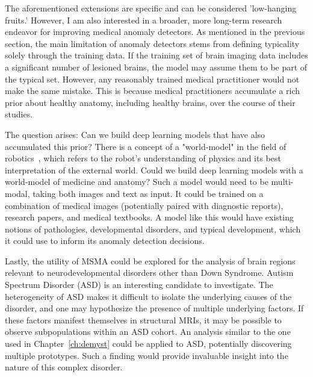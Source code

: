 The aforementioned extensions are specific and can be considered 'low-hanging fruits.' However, I am also interested in a broader, more long-term research endeavor for improving medical anomaly detectors. As mentioned in the previous section, the main limitation of anomaly detectors stems from defining typicality solely through the training data. If the training set of brain imaging data includes a significant number of lesioned brains, the model may assume them to be part of the typical set. However, any reasonably trained medical practitioner would not make the same mistake. This is because medical practitioners accumulate a rich prior about healthy anatomy, including healthy brains, over the course of their studies.

The question arises: Can we build deep learning models that have also accumulated this prior? There is a concept of a "world-model" in the field of robotics~\cite{ha2018world}, which refers to the robot's understanding of physics and its best interpretation of the external world. Could we build deep learning models with a world-model of medicine and anatomy? Such a model would need to be multi-modal, taking both images and text as input. It could be trained on a combination of medical images (potentially paired with diagnostic reports), research papers, and medical textbooks. A model like this would have existing notions of pathologies, developmental disorders, and typical development, which it could use to inform its anomaly detection decisions.

Lastly, the utility of MSMA could be explored for the analysis of brain regions relevant to neurodevelopmental disorders other than Down Syndrome. Autism Spectrum Disorder (ASD) is an interesting candidate to investigate. The heterogeneity of ASD makes it difficult to isolate the underlying causes of the disorder, and one may hypothesize the presence of multiple underlying factors. If these factors manifest themselves in structural MRIs, it may be possible to observe subpopulations within an ASD cohort. An analysis similar to the one used in Chapter~\ref{ch:demyst} could be applied to ASD, potentially discovering multiple prototypes. Such a finding would provide invaluable insight into the nature of this complex disorder.